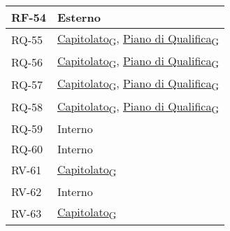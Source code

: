 \begin{longtable}{|>{\centering\arraybackslash}m{}|>{\centering\arraybackslash}m{}|}
	RF-54           & Esterno                                                                                                           \\\hline
	RQ-55           & \href{https://7last.github.io/docs/rtb/documentazione-interna/glossario\#capitolato}{Capitolato\textsubscript{G}}, \href{https://7last.github.io/docs/rtb/documentazione-interna/glossario\#piano-di-qualifica}{Piano di Qualifica\textsubscript{G}} \\\hline
	RQ-56           & \href{https://7last.github.io/docs/rtb/documentazione-interna/glossario\#capitolato}{Capitolato\textsubscript{G}}, \href{https://7last.github.io/docs/rtb/documentazione-interna/glossario\#piano-di-qualifica}{Piano di Qualifica\textsubscript{G}} \\\hline
	RQ-57           & \href{https://7last.github.io/docs/rtb/documentazione-interna/glossario\#capitolato}{Capitolato\textsubscript{G}}, \href{https://7last.github.io/docs/rtb/documentazione-interna/glossario\#piano-di-qualifica}{Piano di Qualifica\textsubscript{G}} \\\hline
	RQ-58           & \href{https://7last.github.io/docs/rtb/documentazione-interna/glossario\#capitolato}{Capitolato\textsubscript{G}}, \href{https://7last.github.io/docs/rtb/documentazione-interna/glossario\#piano-di-qualifica}{Piano di Qualifica\textsubscript{G}} \\\hline
	RQ-59           & Interno                                                                                                                                                                                                                                              \\\hline
	RQ-60           & Interno                                                                                                                                                                                                                                              \\\hline
	RV-61           & \href{https://7last.github.io/docs/rtb/documentazione-interna/glossario\#capitolato}{Capitolato\textsubscript{G}} \\\hline
	RV-62           & Interno                                                                                                           \\\hline
	RV-63           & \href{https://7last.github.io/docs/rtb/documentazione-interna/glossario\#capitolato}{Capitolato\textsubscript{G}} \\\hline

\end{longtable}

